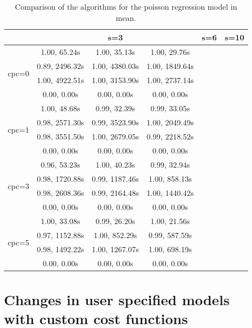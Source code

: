 \documentclass[article]{jss}\usepackage[]{graphicx}\usepackage[]{xcolor}
\begin{document}
\begin{table}[t!]
  \centering
  \begin{tabular}{@{}cccccccccc@{}}
  \toprule
                         & \multicolumn{3}{c}{s=3}           & \multicolumn{3}{c}{s=6}           & \multicolumn{3}{c}{s=10}          \\ \midrule
  \multirow{4}{*}{cpc=0} & 1.00, 65.24s & 1.00, 35.13s & 1.00, 29.76s \\
                         & 0.89, 2496.32s & 1.00, 4380.03s & 1.00, 1849.64s \\
                         & 1.00, 4922.51s & 1.00, 3153.90s & 1.00, 2737.14s \\
                         & 0.00, 0.00s & 0.00, 0.00s & 0.00, 0.00s \\ \midrule
  \multirow{4}{*}{cpc=1} & 1.00, 48.68s & 0.99, 32.39s & 0.99, 33.05s \\
                         & 0.98, 2571.30s & 0.99, 3523.90s & 1.00, 2049.49s \\
                         & 0.98, 3551.50s & 1.00, 2679.05s & 0.99, 2218.52s \\
                         & 0.00, 0.00s & 0.00, 0.00s & 0.00, 0.00s \\ \midrule
  \multirow{4}{*}{cpc=3} & 0.96, 53.23s & 1.00, 40.23s & 0.99, 32.94s \\
                         & 0.98, 1720.88s & 0.99, 1187.46s & 1.00, 858.13s \\
                         & 0.98, 2608.36s & 0.99, 2164.48s & 1.00, 1440.42s \\
                         & 0.00, 0.00s & 0.00, 0.00s & 0.00, 0.00s \\ \midrule
  \multirow{4}{*}{cpc=5} & 1.00, 33.08s & 0.99, 26.20s & 1.00, 21.56s \\
                         & 0.97, 1152.88s & 1.00, 852.29s & 0.99, 587.59s \\
                         & 0.98, 1492.22s & 1.00, 1267.07s & 1.00, 698.19s \\
                         & 0.00, 0.00s & 0.00, 0.00s & 0.00, 0.00s \\ \bottomrule
  \end{tabular}
  \caption{\label{tab:poisson regression comparison} Comparison of the algorithms for the poisson regression model in mean.}
\end{table}

\section{Changes in user specified models with custom cost functions} \label{sec:custom}
\end{document}
